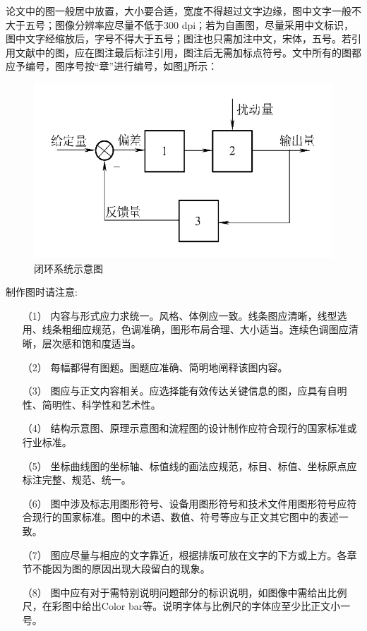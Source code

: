 论文中的图一般居中放置，大小要合适，宽度不得超过文字边缘，图中文字一般不大于五号；图像分辨率应尽量不低于300 dpi；若为自画图，尽量采用中文标识，图中文字经缩放后，字号不得大于五号；图注也只需加注中文，宋体，五号。若引用文献中的图，应在图注最后标注引用，图注后无需加标点符号。文中所有的图都应予编号，图序号按“章”进行编号，如图\ref{Fig4-1}所示：
\begin{figure}[!htbp]
    \centering
    \includegraphics{figures/Fig4-1.png}
    \caption{闭环系统示意图}\label{Fig4-1}
\end{figure}
制作图时请注意:
\begin{enumerate}
    \item[（1）] 内容与形式应力求统一。风格、体例应一致。线条图应清晰，线型选用、线条粗细应规范，色调准确，图形布局合理、大小适当。连续色调图应清晰，层次感和饱和度适当。
    \item[（2）] 每幅都得有图题。图题应准确、简明地阐释该图内容。
    \item[（3）] 图应与正文内容相关。应选择能有效传达关键信息的图，应具有自明性、简明性、科学性和艺术性。
    \item[（4）] 结构示意图、原理示意图和流程图的设计制作应符合现行的国家标准或行业标准。
    \item[（5）] 坐标曲线图的坐标轴、标值线的画法应规范，标目、标值、坐标原点应标注完整、规范、统一。
    \item[（6）] 图中涉及标志用图形符号、设备用图形符号和技术文件用图形符号应符合现行的国家标准。图中的术语、数值、符号等应与正文其它图中的表述一致。
    \item[（7）] 图应尽量与相应的文字靠近，根据排版可放在文字的下方或上方。各章节不能因为图的原因出现大段留白的现象。
    \item[（8）] 图中应有对于需特别说明问题部分的标识说明，如图像中需给出比例尺，在彩图中给出Color bar等。说明字体与比例尺的字体应至少比正文小一号。
\end{enumerate}





